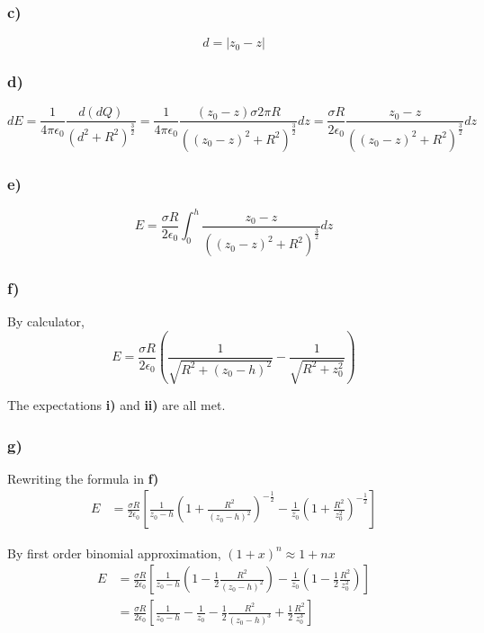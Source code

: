 \documentclass[../homework.tex]{subfiles}
\begin{document}
\subsubsection*{c)}
\begin{equation*}
    d = |{z_0 - z}|
\end{equation*}
\subsubsection*{d)}
\begin{equation*}
    dE = \frac{1}{4\pi \epsilon_0} \frac{d(dQ)}{(d^2 + R^2)^\frac{3}{2}} = \frac{1}{4\pi \epsilon_0} \frac{(z_0 - z)\sigma 2 \pi R}{((z_0-z)^2 + R^2)^\frac{3}{2}} dz = \frac{\sigma R}{2\epsilon_0} \frac{z_0 - z}{((z_0-z)^2 + R^2)^\frac{3}{2}} dz
\end{equation*}
\subsubsection*{e)}
\begin{equation*}
    E = \frac{\sigma R}{2\epsilon_0} \int_{0}^{h} \frac{z_0 - z}{((z_0-z)^2 + R^2)^\frac{3}{2}} dz
\end{equation*}
\subsubsection*{f)}\mbox{}

By calculator,
\begin{equation*}
    E = \frac{\sigma R}{2\epsilon_0} \left(
    \frac{1}{\sqrt{R^2 + (z_0 - h)^2}} - \frac{1}{\sqrt{R^2 + z_0^2}}
    \right)
\end{equation*}

The expectations \textbf{i)} and \textbf{ii)} are all met.

\subsubsection*{g)}\mbox{}

Rewriting the formula in \textbf{f)}
\begin{align*}
    E & = \frac{\sigma R}{2\epsilon_0} \left[
        \frac{1}{z_0 - h} \left(1 + \frac{R^2}{(z_0 - h)^2}\right)^{-\frac{1}{2}} - \frac{1}{z_0} \left(1 + \frac{R^2}{z_0^2}\right)^{-\frac{1}{2}}
    \right]
\end{align*}

By first order binomial approximation, $(1 + x)^n \approx 1 + nx$
\begin{align*}
    E & = \frac{\sigma R}{2\epsilon_0} \left[
        \frac{1}{z_0 - h} \left(1 - \frac{1}{2}\frac{R^2}{(z_0 - h)^2}\right) - \frac{1}{z_0} \left(1 - \frac{1}{2}\frac{R^2}{z_0^2}\right)
    \right] \\[10pt]
      &= \frac{\sigma R}{2\epsilon_0} \left[
        \frac{1}{z_0 - h} - \frac{1}{z_0} - \frac{1}{2}\frac{R^2}{(z_0 - h)^3} + \frac{1}{2} \frac{R^2}{z_0^3}
    \right]
\end{align*}
\end{document}
